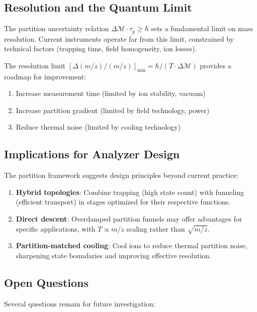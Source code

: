\documentclass[twocolumn,10pt,a4paper]{article}
\theoremstyle{definition}
\theoremstyle{remark}
\newcommand{\Mdepth}{\mathcal{M}}
\newcommand{\taup}{\tau_p}
\begin{document}
\subsection{Resolution and the Quantum Limit}

The partition uncertainty relation $\Delta\Mdepth \cdot \taup \geq \hbar$ sets a fundamental limit on mass resolution. Current instruments operate far from this limit, constrained by technical factors (trapping time, field homogeneity, ion losses).

The resolution limit $[\Delta(m/z)/(m/z)]_{\min} = \hbar/(T \cdot \Delta\Mdepth)$ provides a roadmap for improvement:
\begin{enumerate}
    \item Increase measurement time (limited by ion stability, vacuum)
    \item Increase partition gradient (limited by field technology, power)
    \item Reduce thermal noise (limited by cooling technology)
\end{enumerate}

\subsection{Implications for Analyzer Design}

The partition framework suggests design principles beyond current practice:

\begin{enumerate}
    \item \textbf{Hybrid topologies}: Combine trapping (high state count) with funneling (efficient transport) in stages optimized for their respective functions.

    \item \textbf{Direct descent}: Overdamped partition funnels may offer advantages for specific applications, with $T \propto m/z$ scaling rather than $\sqrt{m/z}$.

    \item \textbf{Partition-matched cooling}: Cool ions to reduce thermal partition noise, sharpening state boundaries and improving effective resolution.
\end{enumerate}

\subsection{Open Questions}

Several questions remain for future investigation:
\end{document}
